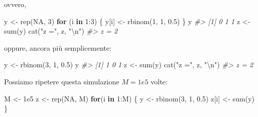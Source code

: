 \documentclass[
  11pt,
]{krantz}
\makeatletter
\newenvironment{Shaded}{\begin{snugshade}}{\end{snugshade}}
\newcommand{\CommentTok}[1]{\textcolor[rgb]{0.37,0.37,0.37}{\textit{#1}}}
\newcommand{\ConstantTok}[1]{\textcolor[rgb]{0,0,0}{#1}}
\newcommand{\ControlFlowTok}[1]{\textcolor[rgb]{0.27,0.27,0.27}{\textbf{#1}}}
\newcommand{\DecValTok}[1]{\textcolor[rgb]{0.06,0.06,0.06}{#1}}
\newcommand{\FloatTok}[1]{\textcolor[rgb]{0.06,0.06,0.06}{#1}}
\newcommand{\FunctionTok}[1]{\textcolor[rgb]{0,0,0}{#1}}
\newcommand{\NormalTok}[1]{#1}
\newcommand{\OtherTok}[1]{\textcolor[rgb]{0.37,0.37,0.37}{#1}}
\newcommand{\SpecialCharTok}[1]{\textcolor[rgb]{0,0,0}{#1}}
\newcommand{\StringTok}[1]{\textcolor[rgb]{0.5,0.5,0.5}{#1}}
\newenvironment{kframe}{%
\medskip{}
\setlength{\fboxsep}{.8em}
 \def\at@end@of@kframe{}%
 \ifinner\ifhmode%
  \def\at@end@of@kframe{\end{minipage}}%
  \begin{minipage}{\columnwidth}%
 \fi\fi%
 \def\FrameCommand##1{\hskip\@totalleftmargin \hskip-\fboxsep
 \colorbox{shadecolor}{##1}\hskip-\fboxsep
     \hskip-\linewidth \hskip-\@totalleftmargin \hskip\columnwidth}%
 \MakeFramed {\advance\hsize-\width
   \@totalleftmargin\z@ \linewidth\hsize
   \@setminipage}}%
 {\par\unskip\endMakeFramed%
 \at@end@of@kframe}
\renewenvironment{Shaded}{\begin{kframe}}{\end{kframe}}
\theoremstyle{definition}
\theoremstyle{definition}
\theoremstyle{definition}
\theoremstyle{definition}
\theoremstyle{remark}
\makeatother
\begin{document}
ovvero,

\begin{Shaded}
\begin{Highlighting}[]
\NormalTok{y }\OtherTok{\textless{}{-}} \FunctionTok{rep}\NormalTok{(}\ConstantTok{NA}\NormalTok{, }\DecValTok{3}\NormalTok{)}
\ControlFlowTok{for}\NormalTok{ (i }\ControlFlowTok{in} \DecValTok{1}\SpecialCharTok{:}\DecValTok{3}\NormalTok{) \{}
\NormalTok{  y[i] }\OtherTok{\textless{}{-}} \FunctionTok{rbinom}\NormalTok{(}\DecValTok{1}\NormalTok{, }\DecValTok{1}\NormalTok{, }\FloatTok{0.5}\NormalTok{)}
\NormalTok{\}}
\NormalTok{y}
\CommentTok{\#\textgreater{} [1] 0 1 1}
\NormalTok{z }\OtherTok{\textless{}{-}} \FunctionTok{sum}\NormalTok{(y)}
\FunctionTok{cat}\NormalTok{(}\StringTok{"z ="}\NormalTok{, z, }\StringTok{"}\SpecialCharTok{\textbackslash{}n}\StringTok{"}\NormalTok{)}
\CommentTok{\#\textgreater{} z = 2}
\end{Highlighting}
\end{Shaded}

oppure, ancora più semplicemente:

\begin{Shaded}
\begin{Highlighting}[]
\NormalTok{y }\OtherTok{\textless{}{-}} \FunctionTok{rbinom}\NormalTok{(}\DecValTok{3}\NormalTok{, }\DecValTok{1}\NormalTok{, }\FloatTok{0.5}\NormalTok{)}
\NormalTok{y}
\CommentTok{\#\textgreater{} [1] 1 0 1}
\NormalTok{z }\OtherTok{\textless{}{-}} \FunctionTok{sum}\NormalTok{(y)}
\FunctionTok{cat}\NormalTok{(}\StringTok{"z ="}\NormalTok{, z, }\StringTok{"}\SpecialCharTok{\textbackslash{}n}\StringTok{"}\NormalTok{)}
\CommentTok{\#\textgreater{} z = 2}
\end{Highlighting}
\end{Shaded}

Possiamo ripetere questa simulazione \(M = 1e5\) volte:

\begin{Shaded}
\begin{Highlighting}[]
\NormalTok{M }\OtherTok{\textless{}{-}} \FloatTok{1e5}
\NormalTok{z }\OtherTok{\textless{}{-}} \FunctionTok{rep}\NormalTok{(}\ConstantTok{NA}\NormalTok{, M)}
\ControlFlowTok{for}\NormalTok{(i }\ControlFlowTok{in} \DecValTok{1}\SpecialCharTok{:}\NormalTok{M) \{}
\NormalTok{  y }\OtherTok{\textless{}{-}} \FunctionTok{rbinom}\NormalTok{(}\DecValTok{3}\NormalTok{, }\DecValTok{1}\NormalTok{, }\FloatTok{0.5}\NormalTok{)}
\NormalTok{  z[i] }\OtherTok{\textless{}{-}} \FunctionTok{sum}\NormalTok{(y)}
\NormalTok{\}}
\end{Highlighting}
\end{Shaded}
\end{document}
